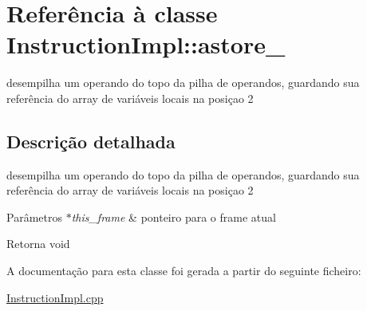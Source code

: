 \hypertarget{class_instruction_impl_1_1astore__2}{}\section{Referência à classe Instruction\+Impl\+:\+:astore\+\_}
\label{class_instruction_impl_1_1astore__2}


desempilha um operando do topo da pilha de operandos, guardando sua referência do array de variáveis locais na posiçao 2  




\subsection{Descrição detalhada}
desempilha um operando do topo da pilha de operandos, guardando sua referência do array de variáveis locais na posiçao 2 


\begin{DoxyParams}{Parâmetros}
{\em $\ast$this\+\_\+frame} & ponteiro para o frame atual \\
\hline
\end{DoxyParams}
\begin{DoxyReturn}{Retorna}
void 
\end{DoxyReturn}


A documentação para esta classe foi gerada a partir do seguinte ficheiro\+:\begin{DoxyCompactItemize}
\item 
\hyperlink{_instruction_impl_8cpp}{Instruction\+Impl.\+cpp}\end{DoxyCompactItemize}
